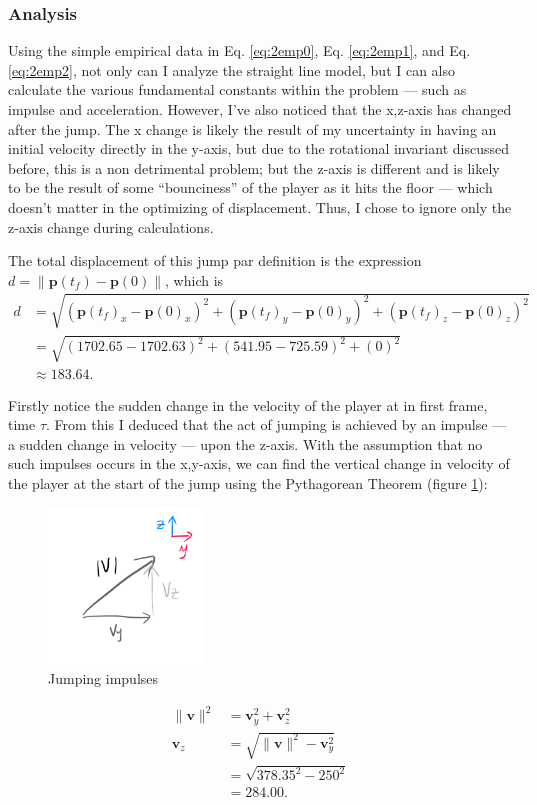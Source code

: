 \documentclass[a4paper,12pt]{article}
\newcommand{\tvec}[1]{\boldsymbol{#1}}
\newcommand{\tmag}[1]{\|#1\|}
\newcommand{\tv}{\tvec{v}}
\newcommand{\tp}{\tvec{p}}
\begin{document}
\subsubsection{Analysis}
Using the simple empirical data in Eq. \ref{eq:2emp0}, Eq. \ref{eq:2emp1}, and Eq. \ref{eq:2emp2}, not only can I analyze the straight line model, but I can also calculate the various fundamental constants within the problem --- such as impulse and acceleration. However, I've also noticed that the x,z-axis has changed after the jump. The x change is likely the result of my uncertainty in having an initial velocity directly in the y-axis, but due to the rotational invariant discussed before, this is a non detrimental problem; but the z-axis is different and is likely to be the result of some ``bounciness'' of the player as it hits the floor --- which doesn't matter in the optimizing of displacement. Thus, I chose to ignore only the z-axis change during calculations.

The total displacement of this jump par definition is the expression $d = \tmag{\tp(t_f) - \tp(0)}$, which is
\begin{align*}
    d &= \sqrt{(\tp(t_f)_x - \tp(0)_x)^2 + (\tp(t_f)_y - \tp(0)_y)^2 + (\tp(t_f)_z - \tp(0)_z)^2}\\
    &= \sqrt{(1702.65-1702.63)^2 + (541.95-725.59)^2 + (0)^2}\\
    &\approx 183.64.
\end{align*}


Firstly notice the sudden change in the velocity of the player at in first frame, time $\tau$. From this I deduced that the act of jumping is achieved by an impulse --- a sudden change in velocity --- upon the z-axis. With the assumption that no such impulses occurs in the x,y-axis, we can find the vertical change in velocity of the player at the start of the jump using the Pythagorean Theorem (figure \ref{fig:2verticalimpulse}):
\begin{figure}
    \includegraphics[width=0.37\textwidth,right]{assets/2verticalimpulse.png}
    \caption{Jumping impulses}
    \label{fig:2verticalimpulse}
\end{figure}
\begin{align*}
    \tmag{\tv}^2 &= \tv_y^2 + \tv_z^2\\
    \tv_z &= \sqrt{\tmag{\tv}^2 - \tv_y^2}\\
    &= \sqrt{378.35^2 -250^2}\\
    &= 284.00.
\end{align*}
\end{document}
